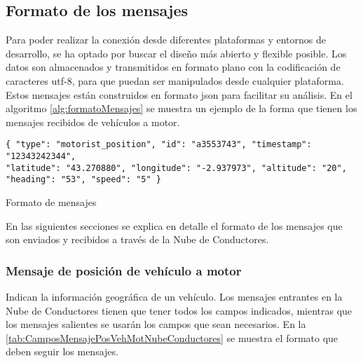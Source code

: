\subsection{Formato de los mensajes}\label{ssection:FormatoMensajesNC}
Para poder realizar la conexión desde diferentes plataformas y entornos de
desarrollo, se ha optado por buscar el diseño más abierto y flexible posible.
Los datos son almacenados y transmitidos en formato plano con la codificación
de caracteres \gls{utf-8}, para que puedan ser manipulados desde cualquier
plataforma. Estos mensajes están construidos en formato \gls{json} para
facilitar su análisis. En el algoritmo \ref{alg:formatoMensajes} se muestra un
ejemplo de la forma que tienen los mensajes recibidos de vehículos a motor.

\begin{listing}
	\begin{minipage}{.4\textwidth}
		\begin{verbatim}
{ "type": "motorist_position", "id": "a3553743", "timestamp": "12343242344",
"latitude": "43.270880", "longitude": "-2.937973", "altitude": "20",
"heading": "53", "speed": "5" }
		\end{verbatim}
	\end{minipage}
	\caption{Formato de mensajes}\label{alg:formatoMensajes}
\end{listing}

En las siguientes secciones se explica en detalle el formato de los mensajes
que son enviados y recibidos a través de la Nube de Conductores.

\subsubsection{Mensaje de posición de vehículo a motor}\label{sssection:MensajePosVehMotor}
Indican la información geográfica de un vehículo. Los mensajes entrantes en
la Nube de Conductores tienen que tener todos los campos indicados, mientras
que los mensajes salientes se usarán los campos que sean necesarios. En la
\ref{tab:CamposMensajePosVehMotNubeConductores} se muestra el formato que deben
seguir los mensajes.

